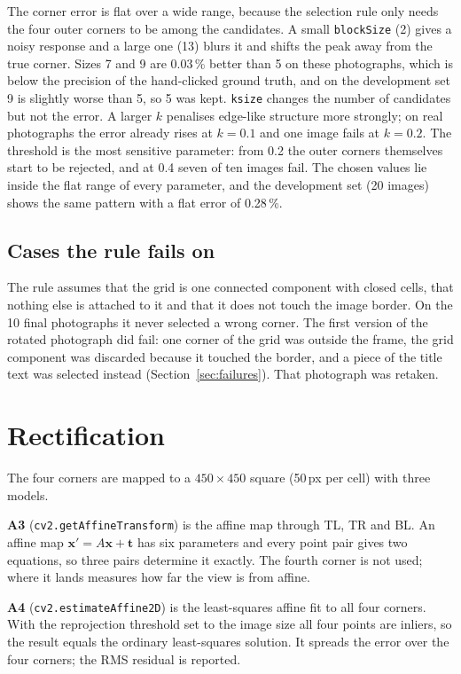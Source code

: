 \documentclass[conference]{IEEEtran}
\begin{document}
The corner error is flat over a wide range, because the selection rule only
needs the four outer corners to be among the candidates. A small
\texttt{blockSize} (2) gives a noisy response and a large one (13) blurs it
and shifts the peak away from the true corner. Sizes 7 and 9 are 0.03\,\%
better than 5 on these photographs, which is below the precision of the
hand-clicked ground truth, and on the development set 9 is slightly worse
than 5, so 5 was kept. \texttt{ksize} changes the number of candidates but
not the error. A larger $k$ penalises edge-like structure more strongly; on
real photographs the error already rises at $k=0.1$ and one image fails at
$k=0.2$. The threshold is the most sensitive parameter: from 0.2 the outer
corners themselves start to be rejected, and at 0.4 seven of ten images
fail. The chosen values lie inside the flat range of every parameter, and
the development set (20 images) shows the same pattern with a flat error of
0.28\,\%.

\subsection{Cases the rule fails on}
The rule assumes that the grid is one connected component with closed cells,
that nothing else is attached to it and that it does not touch the image
border. On the 10 final photographs it never selected a wrong corner. The
first version of the rotated photograph did fail: one corner of the grid was
outside the frame, the grid component was discarded because it touched the
border, and a piece of the title text was selected instead
(Section~\ref{sec:failures}). That photograph was retaken.

\section{Rectification}
The four corners are mapped to a $450\times450$ square (50\,px per cell)
with three models.

\textbf{A3} (\texttt{cv2.getAffineTransform}) is the affine map through TL,
TR and BL. An affine map
$\mathbf{x}' = A\mathbf{x} + \mathbf{t}$ has six parameters and every point
pair gives two equations, so three pairs determine it exactly. The fourth
corner is not used; where it lands measures how far the view is from affine.

\textbf{A4} (\texttt{cv2.estimateAffine2D}) is the least-squares affine fit
to all four corners. With the reprojection threshold set to the image size
all four points are inliers, so the result equals the ordinary least-squares
solution. It spreads the error over the four corners; the RMS residual is
reported.
\end{document}
